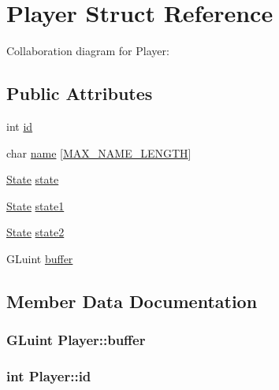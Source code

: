 \hypertarget{structPlayer}{}\section{Player Struct Reference}
\label{structPlayer}


Collaboration diagram for Player\+:
\subsection*{Public Attributes}
\begin{DoxyCompactItemize}
\item 
int \hyperlink{structPlayer_a05e05f3a23de78da7ec032ec2bcf8c6c}{id}
\item 
char \hyperlink{structPlayer_a000f74f4241ebc344866c82bec4ed5ef}{name} \mbox{[}\hyperlink{main_8c_a0c397a708cec89c74029582574516b30}{M\+A\+X\+\_\+\+N\+A\+M\+E\+\_\+\+L\+E\+N\+G\+TH}\mbox{]}
\item 
\hyperlink{structState}{State} \hyperlink{structPlayer_ac4a623bf6650a719187c50bb0413b9a0}{state}
\item 
\hyperlink{structState}{State} \hyperlink{structPlayer_a7712ad6df23e875de18fb38537620909}{state1}
\item 
\hyperlink{structState}{State} \hyperlink{structPlayer_a7b894c51bb7a740af4a2ffef56a4e788}{state2}
\item 
G\+Luint \hyperlink{structPlayer_a6be397c2a7cb79256e85dc6a96055f45}{buffer}
\end{DoxyCompactItemize}


\subsection{Member Data Documentation}
\subsubsection[{\texorpdfstring{buffer}{buffer}}]{\setlength{\rightskip}{0pt plus 5cm}G\+Luint Player\+::buffer}\hypertarget{structPlayer_a6be397c2a7cb79256e85dc6a96055f45}{}\label{structPlayer_a6be397c2a7cb79256e85dc6a96055f45}
\subsubsection[{\texorpdfstring{id}{id}}]{\setlength{\rightskip}{0pt plus 5cm}int Player\+::id}\hypertarget{structPlayer_a05e05f3a23de78da7ec032ec2bcf8c6c}{}\label{structPlayer_a05e05f3a23de78da7ec032ec2bcf8c6c}
